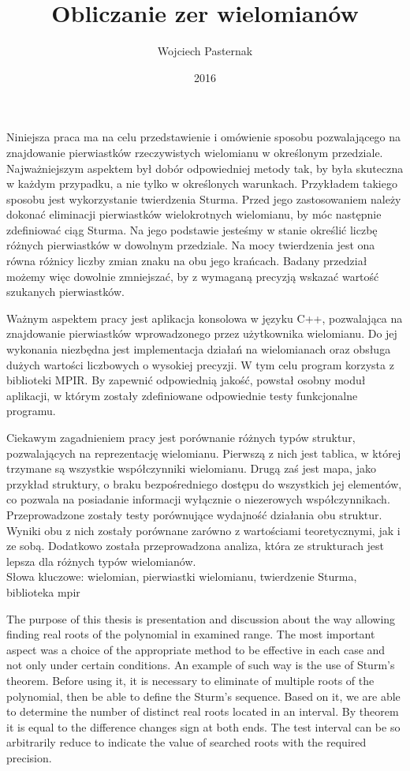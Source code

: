 \documentclass[twoside,a4paper]{book}
\title{Obliczanie zer wielomianów}
\author{Wojciech Pasternak}
\date{2016}
\begin{document}
\frontmatter
\maketitle
	
Niniejsza praca ma na celu przedstawienie i omówienie sposobu pozwalającego na znajdowanie pierwiastków rzeczywistych wielomianu w określonym przedziale. Najważniejszym aspektem był dobór odpowiedniej metody tak, by była skuteczna w każdym przypadku, a nie tylko w określonych warunkach. Przykładem takiego sposobu jest wykorzystanie twierdzenia Sturma. Przed jego zastosowaniem należy dokonać eliminacji pierwiastków wielokrotnych wielomianu, by móc następnie zdefiniować ciąg Sturma. Na jego podstawie jesteśmy w stanie określić liczbę różnych pierwiastków w dowolnym przedziale.  Na mocy twierdzenia jest ona równa różnicy liczby zmian znaku na obu jego krańcach. Badany przedział możemy więc dowolnie zmniejszać, by z wymaganą precyzją wskazać wartość szukanych pierwiastków.

Ważnym aspektem pracy jest aplikacja konsolowa w języku C++, pozwalająca na znajdowanie pierwiastków wprowadzonego przez użytkownika wielomianu. Do jej wykonania niezbędna jest implementacja działań na wielomianach oraz obsługa dużych wartości liczbowych o wysokiej precyzji. W tym celu program korzysta z biblioteki MPIR. By zapewnić odpowiednią jakość, powstał osobny moduł aplikacji, w którym zostały zdefiniowane odpowiednie testy funkcjonalne programu.

Ciekawym zagadnieniem pracy jest porównanie różnych typów struktur, pozwalających na reprezentację wielomianu. Pierwszą z nich jest tablica, w której trzymane są wszystkie współczynniki wielomianu. Drugą zaś jest mapa, jako przykład struktury, o braku bezpośredniego dostępu do wszystkich jej elementów, co pozwala na posiadanie informacji wyłącznie o niezerowych współczynnikach. Przeprowadzone zostały testy porównujące wydajność działania obu struktur. Wyniki obu z nich zostały porównane zarówno z wartościami teoretycznymi, jak i ze sobą. Dodatkowo została przeprowadzona analiza, która ze strukturach jest lepsza dla różnych typów wielomianów. \\

Słowa kluczowe: wielomian, pierwiastki wielomianu, twierdzenie Sturma, biblioteka mpir

The purpose of this thesis is presentation and discussion about the way allowing finding real roots of the polynomial in examined range. The most important aspect was a choice of the appropriate method to be effective in each case and not only under certain conditions. An example of such way is the use of Sturm’s theorem. Before using it, it is necessary to eliminate of multiple roots of the polynomial, then be able to define the Sturm’s sequence. Based on it, we are able to determine the number of distinct real roots located in an interval. By theorem it is equal to the difference changes sign at both ends. The test interval can be so arbitrarily reduce to indicate the value of searched roots with the required precision. \\
\end{document}
